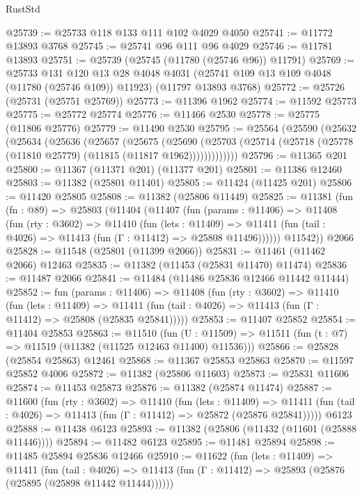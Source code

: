 \begin{lexlean}{RustStd}
\begin{coremodule}
@25739 := @25733 @118 @133 @111 @102 @4029 @4050
@25741 := @11772 @13893 @3768
@25745 := @25741 @96 @111 @96 @4029
@25746 := @11781 @13893
@25751 := @25739 (@25745 (@11780 (@25746 @96)) @11791)
@25769 := @25733
    @131
    @120
    @13
    @28
    @4048
    @4031
    (@25741 @109 @13 @109 @4048 (@11780 (@25746 @109)) @11923)
    (@11797 @13893 @3768)
@25772 := @25726 (@25731 (@25751 @25769))
@25773 := @11396 @1962
@25774 := @11592 @25773
@25775 := @25772 @25774
@25776 := @11466 @2530
@25778 := @25775 (@11806 @25776)
@25779 := @11490 @2530
@25795 := @25564
    (@25590
      (@25632
        (@25634
          (@25636
            (@25657
              (@25675
                (@25690
                  (@25703 (@25714 (@25718 (@25778 (@11810 @25779) (@11815 (@11817 @1962)))))))))))))
@25796 := @11365 @201
@25800 := @11367 (@11371 @201) (@11377 @201)
@25801 := @11386 @12460
@25803 := @11382 (@25801 @11401)
@25805 := @11424 (@11425 @201)
@25806 := @11420 @25805
@25808 := @11382 (@25806 @11449)
@25825 := @11381
    (fun (fn : @89) =>
    @25803
      (@11404
        (@11407
          (fun (params : @11406) =>
          @11408
            (fun (rty : @3602) =>
            @11410
              (fun (lets : @11409) =>
              @11411 (fun (tail : @4026) => @11413 (fun (Γ : @11412) => @25808 @11496))))))
        @11542))
    @2066
@25828 := @11548 (@25801 (@11399 @2066))
@25831 := @11461 (@11462 @2066) @12463
@25835 := @11382 (@11453 (@25831 @11470) @11474)
@25836 := @11487 @2066
@25841 := @11484 (@11486 @25836 @12466 @11442 @11444)
@25852 := fun (params : @11406) =>
  @11408
    (fun (rty : @3602) =>
    @11410
      (fun (lets : @11409) =>
      @11411 (fun (tail : @4026) => @11413 (fun (Γ : @11412) => @25808 (@25835 @25841)))))
@25853 := @11407 @25852
@25854 := @11404 @25853
@25863 := @11510
    (fun (U : @11509) => @11511 (fun (t : @7) => @11519 (@11382 (@11525 @12463 @11400) @11536)))
@25866 := @25828 (@25854 @25863) @12461
@25868 := @11367 @25853 @25863
@25870 := @11597 @25852 @4006
@25872 := @11382 (@25806 @11603)
@25873 := @25831 @11606
@25874 := @11453 @25873
@25876 := @11382 (@25874 @11474)
@25887 := @11600
    (fun (rty : @3602) =>
    @11410
      (fun (lets : @11409) =>
      @11411 (fun (tail : @4026) => @11413 (fun (Γ : @11412) => @25872 (@25876 @25841)))))
    @6123
@25888 := @11438 @6123
@25893 := @11382 (@25806 (@11432 (@11601 (@25888 @11446))))
@25894 := @11482 @6123
@25895 := @11481 @25894
@25898 := @11485 @25894 @25836 @12466
@25910 := @11622
    (fun (lets : @11409) =>
    @11411
      (fun (tail : @4026) =>
      @11413 (fun (Γ : @11412) => @25893 (@25876 (@25895 (@25898 @11442 @11444))))))

\end{coremodule}
\end{lexlean}
